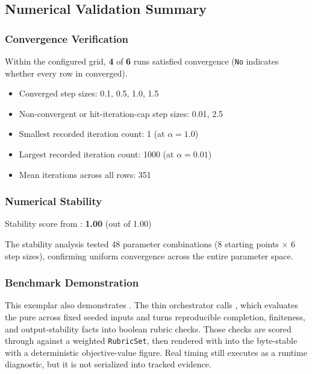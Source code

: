 \documentclass[
  english,
]{article}
\providecommand{\tightlist}{%
  \setlength{\itemsep}{0pt}\setlength{\parskip}{0pt}}
\begin{document}
\subsection{Numerical Validation
Summary}\label{numerical-validation-summary}

\subsubsection{Convergence Verification}\label{convergence-verification}

Within the configured grid, \textbf{4} of \textbf{6} runs satisfied
 convergence (\texttt{No} indicates whether
every row in  converged).

\begin{itemize}
\tightlist
\item
  Converged step sizes: 0.1, 0.5, 1.0, 1.5
\item
  Non-convergent or hit-iteration-cap step sizes: 0.01, 2.5
\item
  Smallest recorded iteration count: 1 (at \(\alpha = 1.0\))
\item
  Largest recorded iteration count: 1000 (at \(\alpha = 0.01\))
\item
  Mean iterations across all rows: 351
\end{itemize}

\subsubsection{Numerical Stability}\label{numerical-stability}

Stability score from :
\textbf{1.00} (out of 1.00)

The stability analysis tested 48 parameter combinations (8 starting
points \(\times\) 6 step sizes), confirming uniform convergence across
the entire parameter space.

\subsubsection{Benchmark Demonstration}\label{benchmark-demonstration}

This exemplar also demonstrates . The
thin orchestrator  calls
, which evaluates the pure
 across fixed seeded inputs and turns
reproducible completion, finiteness, and output-stability facts into
boolean rubric checks. Those checks are scored through
 against a weighted
\texttt{RubricSet}, then rendered with 
into the byte-stable  with
a deterministic objective-value figure. Real timing still executes as a
runtime diagnostic, but it is not serialized into tracked evidence.
\end{document}
